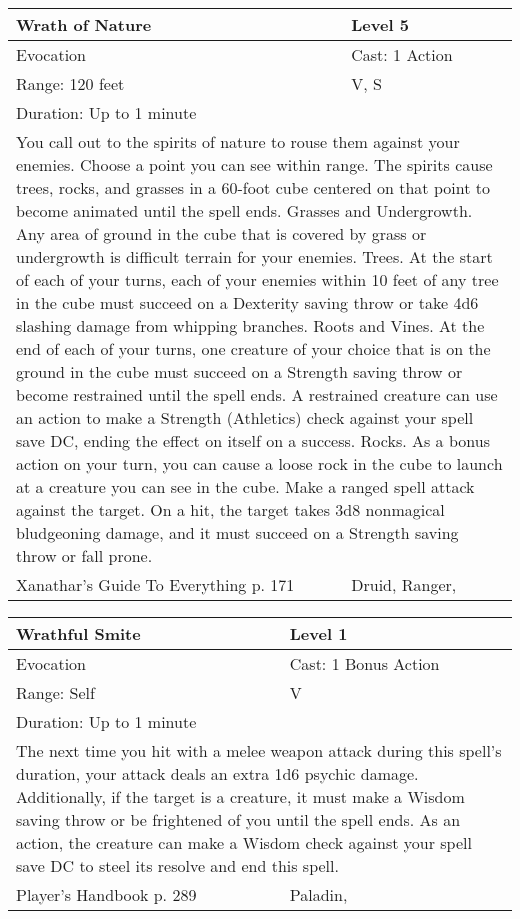 \documentclass[11pt]{report}
\begin{document}
\begin{table}[H]
	\begin{tabular}{||p{6cm}|p{6cm}||}
		\hline\hline
		\bf{Wrath of Nature} & Level 5\\ \hline
		Evocation & Cast: 1 Action\\ \hline
		Range: 120 feet & V, S\\ \hline
		Duration: Up to 1 minute & \\ \hline
		\multicolumn{2}{||p{12cm}||}{You call out to the spirits of nature to rouse them against your enemies. Choose a point you can see within range. The spirits cause trees, rocks, and grasses in a 60-foot cube centered on that point to become animated until the spell ends.
Grasses and Undergrowth. Any area of ground in the cube that is covered by grass or undergrowth is difficult terrain for your enemies.
Trees. At the start of each of your turns, each of your enemies within 10 feet of any tree in the cube must succeed on a Dexterity saving throw or take 4d6 slashing damage from whipping branches.
Roots and Vines. At the end of each of your turns, one creature of your choice that is on the ground in the cube must succeed on a Strength saving throw or become restrained until the spell ends. A restrained creature can use an action to make a Strength (Athletics) check against your spell save DC, ending the effect on itself on a success.
Rocks. As a bonus action on your turn, you can cause a loose rock in the cube to launch at a creature you can see in the cube. Make a ranged spell attack against the target. On a hit, the target takes 3d8 nonmagical bludgeoning damage, and it must succeed on a Strength saving throw or fall prone.}\\ \hline
Xanathar's Guide To Everything p. 171 & Druid, Ranger, \\ \hline\hline
	\end{tabular}
\end{table}

\begin{table}[H]
	\begin{tabular}{||p{6cm}|p{6cm}||}
		\hline\hline
		\bf{Wrathful Smite} & Level 1\\ \hline
		Evocation & Cast: 1 Bonus Action\\ \hline
		Range: Self & V\\ \hline
		Duration: Up to 1 minute & \\ \hline
		\multicolumn{2}{||p{12cm}||}{The next time you hit with a melee weapon attack during this spell’s duration, your attack deals an extra 1d6 psychic damage.
Additionally, if the target is a creature, it must make a Wisdom saving throw or be frightened of you until the spell ends. As an action, the creature can make a Wisdom check against your spell save DC to steel its resolve and end this spell.}\\ \hline
Player's Handbook p. 289 & Paladin, \\ \hline\hline
	\end{tabular}
\end{table}
\end{document}
